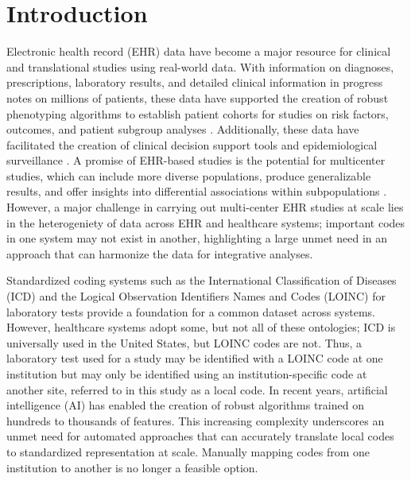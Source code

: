\documentclass{article}
\begin{document}
\section{Introduction}

Electronic health record (EHR) data have become a major resource for clinical and translational studies using real-world data. With information on diagnoses, prescriptions, laboratory results, and detailed clinical information in progress notes on millions of patients, these data have supported the creation of robust phenotyping algorithms to establish patient cohorts for studies on risk factors, outcomes, and patient subgroup analyses \citep{bai2018ehr, Xiong2023.09.29.23296239,liao2015development}. Additionally, these data have facilitated the creation of clinical decision support tools 
\citep{federico2015gnaeus} and epidemiological surveillance \citep{ferte2022benefit}. A promise of EHR-based studies is the potential for multicenter studies, which can include more diverse populations, produce generalizable results, and offer insights into differential associations within subpopulations \citep{cai2022consensus}.  However, a major challenge in carrying out multi-center EHR studies at scale lies in the heterogeniety of data across EHR and healthcare systems; important codes in one system may not exist in another, highlighting a large unmet need in an approach that can harmonize the data for integrative analyses. 


Standardized coding systems such as the International Classification of Diseases (ICD)  \citep{world1988international,bramer1988international} and the Logical Observation Identifiers Names and Codes (LOINC) for laboratory tests \citep{mcdonald2003loinc} provide a foundation for a common dataset across systems. However, healthcare systems adopt some, but not all of these ontologies; ICD is universally used in the United States, but LOINC codes are not.  Thus, a laboratory test used for a study may be identified with a LOINC code at one institution but may only be identified using an institution-specific code at another site, referred to in this study as a local code. In recent years, artificial intelligence (AI) has enabled the creation of robust algorithms trained on hundreds to thousands of features.  This increasing complexity underscores an unmet need for automated approaches that can accurately translate local codes to standardized representation at scale. Manually mapping codes from one institution to another is no longer a feasible option.
\end{document}
